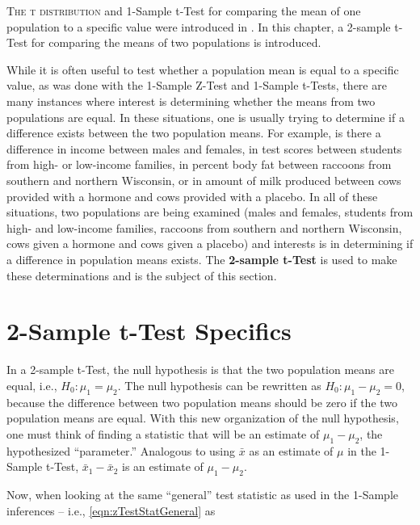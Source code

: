 \documentclass[10pt,openany]{book}\usepackage[]{graphicx}\usepackage[]{color}
\begin{document}
\minitoc
\newpage

\lettrine{T}{he t distribution} and 1-Sample t-Test for comparing the mean of one population to a specific value were introduced in . In this chapter, a 2-sample t-Test for comparing the means of two populations is introduced.

While it is often useful to test whether a population mean is equal to a specific value, as was done with the 1-Sample Z-Test and 1-Sample t-Tests, there are many instances where interest is determining whether the means from two populations are equal.  In these situations, one is usually trying to determine if a difference exists between the two population means.  For example, is there a difference in income between males and females, in test scores between students from high- or low-income families, in percent body fat between raccoons from southern and northern Wisconsin, or in amount of milk produced between cows provided with a hormone and cows provided with a placebo.  In all of these situations, two populations are being examined (males and females, students from high- and low-income families, raccoons from southern and northern Wisconsin, cows given a hormone and cows given a placebo) and interests is in determining if a difference in population means exists.  The \textbf{2-sample t-Test} is used to make these determinations and is the subject of this section.

\section{2-Sample t-Test Specifics}
In a 2-sample t-Test, the null hypothesis is that the two population means are equal, i.e., $H_{0}:\mu_{1}=\mu_{2}$.  The null hypothesis can be rewritten as $H_{0}:\mu_{1}-\mu_{2}=0$, because the difference between two population means should be zero if the two population means are equal.  With this new organization of the null hypothesis, one must think of finding a statistic that will be an estimate of $\mu_{1}-\mu_{2}$, the hypothesized ``parameter.''  Analogous to using $\bar{x}$ as an estimate of $\mu$ in the 1-Sample t-Test, $\bar{x}_{1}-\bar{x}_{2}$ is an estimate of $\mu_{1}-\mu_{2}$.


Now, when looking at the same ``general'' test statistic as used in the 1-Sample inferences -- i.e., \eqref{eqn:zTestStatGeneral} as
\end{document}
